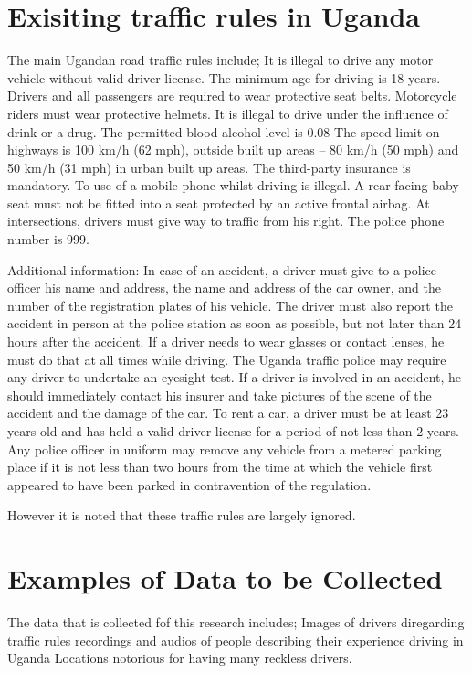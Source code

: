 \documentclass{article}                    %
\begin{document}
\section{Exisiting traffic rules in Uganda}
The main Ugandan road traffic rules include;
It is illegal to drive any motor vehicle without valid driver license.
The minimum age for driving is 18 years.
Drivers and all passengers are required to wear protective seat belts.
Motorcycle riders must wear protective helmets.
It is illegal to drive under the influence of drink or a drug. The permitted blood alcohol level is 0.08%
The speed limit on highways is 100 km/h (62 mph), outside built up areas – 80 km/h (50 mph) and 50 km/h (31 mph) in urban built up areas.
The third-party insurance is mandatory.
To use of a mobile phone whilst driving is illegal.
A rear-facing baby seat must not be fitted into a seat protected by an active frontal airbag.
At intersections, drivers must give way to traffic from his right.
The police phone number is 999.

Additional information:
In case of an accident, a driver must give to a police officer his name and address, the name and address of the car owner, and the number of the registration plates of his vehicle. The driver must also report the accident in person at the police station as soon as possible, but not later than 24 hours after the accident.
If a driver needs to wear glasses or contact lenses, he must do that at all times while driving. The Uganda traffic police may require any driver to undertake an eyesight test.
If a driver is involved in an accident, he should immediately contact his insurer and take pictures of the scene of the accident and the damage of the car.
To rent a car, a driver must be at least 23 years old and has held a valid driver license for a period of not less than 2 years.
Any police officer in uniform may remove any vehicle from a metered parking place if it is not less than two hours from the time at which the vehicle first appeared to have been parked in contravention of the regulation.

However it is noted that these traffic rules are largely ignored.

\section{Examples of Data to be Collected}
The data that is collected fof this research includes;
Images of drivers diregarding traffic rules
recordings and audios of people describing their experience driving in Uganda
Locations notorious for having many reckless drivers.
\end{document}
